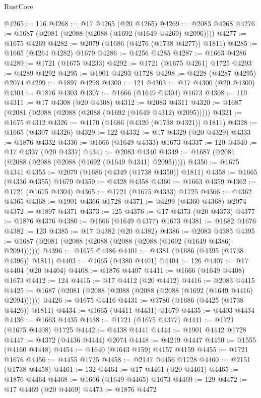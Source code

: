 \begin{lexlean}{RustCore}
\begin{coremodule}
@4265 := 116
@4268 := @17 @4265 (@20 @4265)
@4269 := @2083 @4268
@4276 := @1687 (@2081 (@2088 (@2088 (@1692 (@1649 @4269) @2096))))
@4277 := @1675 @4269
@4282 := @2079 (@1686 (@4276 (@1738 @4277)) @1811)
@4285 := @1665 (@4264 @4282) @1679
@4286 := @4256 @4285
@4287 := @1663 @4286
@4289 := @1721 (@1675 @4233)
@4292 := @1721 (@1675 @4261) @1725
@4293 := @4289 @4292
@4295 := @1901 @4293 @1728
@4298 := @4228 (@4287 @4295) @2074
@4299 := @1897 @4298
@4300 := 121
@4303 := @17 @4300 (@20 @4300)
@4304 := @1876 @4303
@4307 := @1666 (@1649 @4304) @1673
@4308 := 119
@4311 := @17 @4308 (@20 @4308)
@4312 := @2083 @4311
@4320 := @1687 (@2081 (@2088 (@2088 (@2088 (@1692 (@1649 @4312) @2095)))))
@4321 := @1675 @4312
@4326 := @4170 (@1686 (@4320 (@1738 @4321)) @1811)
@4328 := @1665 (@4307 @4326)
@4329 := 122
@4332 := @17 @4329 (@20 @4329)
@4333 := @1876 @4332
@4336 := @1666 (@1649 @4333) @1673
@4337 := 120
@4340 := @17 @4337 (@20 @4337)
@4341 := @2083 @4340
@4349 := @1687 (@2081 (@2088 (@2088 (@2088 (@1692 (@1649 @4341) @2095)))))
@4350 := @1675 @4341
@4355 := @2079 (@1686 (@4349 (@1738 @4350)) @1811)
@4358 := @1665 (@4336 @4355) @1679
@4359 := @4328 @4358
@4360 := @1663 @4359
@4362 := @1721 (@1675 @4304)
@4365 := @1721 (@1675 @4333) @1725
@4366 := @4362 @4365
@4368 := @1901 @4366 @1728
@4371 := @4299 (@4360 @4368) @2074
@4372 := @1897 @4371
@4373 := 125
@4376 := @17 @4373 (@20 @4373)
@4377 := @1876 @4376
@4380 := @1666 (@1649 @4377) @1673
@4381 := @1682 @1676
@4382 := 123
@4385 := @17 @4382 (@20 @4382)
@4386 := @2083 @4385
@4395 := @1687 (@2081 (@2088 (@2088 (@2088 (@2088 (@1692 (@1649 @4386) @2094))))))
@4396 := @1675 @4386
@4401 := @4381 (@1686 (@4395 (@1738 @4396)) @1811)
@4403 := @1665 (@4380 @4401)
@4404 := 126
@4407 := @17 @4404 (@20 @4404)
@4408 := @1876 @4407
@4411 := @1666 (@1649 @4408) @1673
@4412 := 124
@4415 := @17 @4412 (@20 @4412)
@4416 := @2083 @4415
@4425 := @1687 (@2081 (@2088 (@2088 (@2088 (@2088 (@1692 (@1649 @4416) @2094))))))
@4426 := @1675 @4416
@4431 := @3780 (@1686 (@4425 (@1738 @4426)) @1811)
@4434 := @1665 (@4411 @4431) @1679
@4435 := @4403 @4434
@4436 := @1663 @4435
@4438 := @1721 (@1675 @4377)
@4441 := @1721 (@1675 @4408) @1725
@4442 := @4438 @4441
@4444 := @1901 @4442 @1728
@4447 := @4372 (@4436 @4444) @2074
@4448 := @4219 @4447
@4450 := @1555 (@4160 @4448)
@4454 := @1640 (@1643 @159) @4157 @4159
@4455 := @1721 @1676
@4456 := @4455 @1725
@4458 := @2147 @4456 @1728
@4460 := @2151 (@1738 @4458)
@4461 := 132
@4464 := @17 @4461 (@20 @4461)
@4465 := @1876 @4464
@4468 := @1666 (@1649 @4465) @1673
@4469 := 129
@4472 := @17 @4469 (@20 @4469)
@4473 := @1876 @4472

\end{coremodule}
\end{lexlean}
